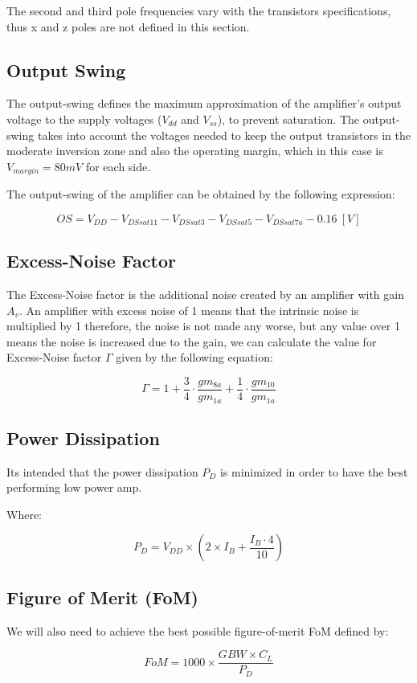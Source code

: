 The second and third pole frequencies vary with the transistors specifications, thus x and z poles are not defined in this section.

\subsection{Output Swing}
The output-swing defines the maximum approximation of the amplifier's output voltage to the supply voltages ($V_{dd}$ and $V_{ss}$), to prevent saturation. The output-swing takes into account the voltages needed to keep the output transistors in the moderate inversion zone and also the operating margin, which in this case is $V_{margin}=80mV$ for each side.

The output-swing of the amplifier can be obtained by the following expression:

$$OS = V_{DD} - V_{DSsat11} - V_{DSsat3} - V_{DSsat5} - V_{DSsat7a} - 0.16 \ [V]$$

\subsection{Excess-Noise Factor}
The Excess-Noise factor is the additional noise created by an amplifier with gain $A_v$. An amplifier with excess noise of 1 means that the intrinsic noise is multiplied by 1 therefore, the noise is not made any worse, but any value over 1 means the noise is increased due to the gain, we can calculate the value for Excess-Noise factor $\Gamma$ given by the following equation:

$$\Gamma = 1 + \frac{3}{4}\cdot \frac{gm_{8a}}{gm_{1a}} + \frac{1}{4}\cdot \frac{gm_{10}}{gm_{1a}}$$

\subsection{Power Dissipation}

Its intended that the power dissipation $P_D$ is minimized in order to have the best performing low power amp.

Where: 

$$P_D = V_{DD} \times \left(2 \times I_B + \dfrac{I_B\cdot 4}{10}\right) $$

\subsection{Figure of Merit (FoM)}
 We will also need to achieve the best possible figure-of-merit FoM defined by: 

$$FoM = 1000 \times \dfrac{GBW \times C_L}{P_D}$$

